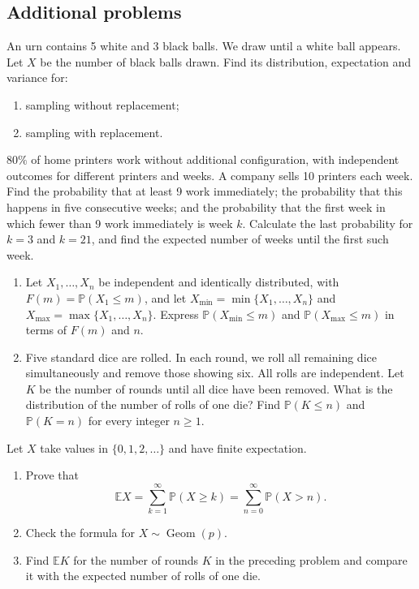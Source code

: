 \documentclass[11pt,a4paper]{article}
\newenvironment{enumeratea}{\begin{enumerate}[label=(\alph*),itemsep=0.28em,topsep=0.25em]}{\end{enumerate}}
\newcommand{\Pbb}{\mathbb P}
\newcommand{\Ebb}{\mathbb E}
\newcommand{\Geom}{\operatorname{Geom}}
\newcounter{problem}[section]
\begin{document}
\subsection*{Additional problems}
\begin{problem}
An urn contains 5 white and 3 black balls. We draw until a white ball appears.
Let $X$ be the number of black balls drawn. Find its distribution, expectation and variance for:
\begin{enumeratea}
  \item sampling without replacement;
  \item sampling with replacement.
\end{enumeratea}
\end{problem}
\begin{problem}
$80\%$ of home printers work without additional configuration, with independent
outcomes for different printers and weeks. A company sells 10 printers each week.
Find the probability that at least 9 work immediately; the probability that this
happens in five consecutive weeks; and the probability that the first week in
which fewer than 9 work immediately is week $k$. Calculate the last probability
for $k=3$ and $k=21$, and find the expected number of weeks until the first such week.
\end{problem}
\begin{problempencil}[Test 1, SE 2023]
\begin{enumeratea}
  \item Let $X_1,\dots,X_n$ be independent and identically distributed, with
  $F(m)=\Pbb(X_1\le m)$, and let $X_{\min}=\min\{X_1,\dots,X_n\}$ and
  $X_{\max}=\max\{X_1,\dots,X_n\}$. Express $\Pbb(X_{\min}\le m)$ and
  $\Pbb(X_{\max}\le m)$ in terms of $F(m)$ and $n$.
  \item Five standard dice are rolled. In each round, we roll all remaining dice
  simultaneously and remove those showing six. All rolls are independent. Let $K$
  be the number of rounds until all dice have been removed. What is the distribution
  of the number of rolls of one die? Find $\Pbb(K\le n)$ and $\Pbb(K=n)$ for every integer $n\ge1$.
\end{enumeratea}
\end{problempencil}
\begin{problem}
Let $X$ take values in $\{0,1,2,\dots\}$ and have finite expectation.
\begin{enumeratea}
  \item Prove that
  \[ \Ebb X=\sum_{k=1}^\infty\Pbb(X\ge k)=\sum_{n=0}^\infty\Pbb(X>n). \]
  \item Check the formula for $X\sim\Geom(p)$.
  \item Find $\Ebb K$ for the number of rounds $K$ in the preceding problem and
  compare it with the expected number of rolls of one die.
\end{enumeratea}
\end{problem}
\end{document}
